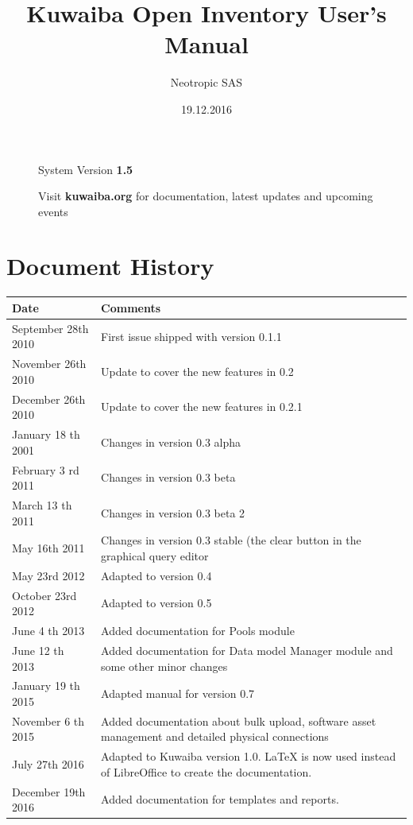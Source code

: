 \documentclass[a4paper]{article}
\title{Kuwaiba Open Inventory User's Manual}
\author{Neotropic SAS}
\date{19.12.2016}
\begin{document}
	\maketitle
	
	
	
	\begin{figure}[b]
		\centering System Version \textbf{1.5}
			
		Visit \textbf{kuwaiba.org} for documentation, latest updates and upcoming events
	\end{figure}
	
	
	\newpage
	
	\tableofcontents

	\newpage
	\section{Document History}
		\begin{table}[h!]
			\centering
			\begin{tabular}{l||p{10cm}} %
				\toprule
				\textbf{Date} & \textbf{Comments}  \\
				\midrule
				September 28th 2010 & First issue shipped with version 0.1.1\\
				\midrule
				November 26th 2010 & Update to cover the new features in 0.2 \\
				\midrule
				December 26th 2010 & Update to cover the new features in 0.2.1 \\
				\midrule
				January 18 th 2001 & Changes in version 0.3 alpha \\
				\midrule
				February 3 rd 2011 & Changes in version 0.3 beta \\
				\midrule
				March 13 th	2011 & Changes in version 0.3 beta 2 \\
				\midrule
				May 16th 2011 & Changes in version 0.3 stable (the clear button in the graphical query editor \\
				\midrule
				May 23rd 2012 & Adapted to version 0.4 \\
				\midrule
				October 23rd 2012 & Adapted to version 0.5 \\
				\midrule
				June 4 th 2013 & Added documentation	for Pools module \\
				\midrule
				June 12 th 2013 & Added documentation for Data model Manager module and some other minor changes\\
				\midrule
				January 19 th 2015 & Adapted manual for version 0.7 \\
				\midrule
				November 6 th 2015 & Added documentation about bulk upload, software asset management and detailed physical connections \\
				\midrule
				July 27th 2016 & Adapted to Kuwaiba version 1.0. LaTeX is now used instead of LibreOffice to create the documentation. \\
				\midrule
				December 19th 2016 & Added documentation for templates and reports.\\
				\bottomrule
			\end{tabular}	
				
		\end{table}
	\newpage
\end{document}
